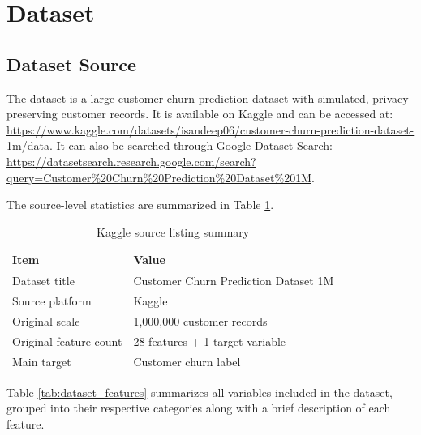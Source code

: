 \section{Dataset}

\subsection{Dataset Source}
The dataset is a large customer churn prediction dataset with simulated, privacy-preserving customer records. It is available on Kaggle and can be accessed at:
\url{https://www.kaggle.com/datasets/isandeep06/customer-churn-prediction-dataset-1m/data}. It can also be searched through Google Dataset Search:
\url{https://datasetsearch.research.google.com/search?query=Customer%20Churn%20Prediction%20Dataset%201M}.

The source-level statistics are summarized in Table \ref{tab:source_listing}.

\begin{table}[h]
\centering
\caption{Kaggle source listing summary}
\label{tab:source_listing}
\begin{tabular}{ll}
\toprule
\textbf{Item} & \textbf{Value} \\
\midrule
Dataset title & Customer Churn Prediction Dataset 1M \\
Source platform & Kaggle \\
Original scale & 1,000,000 customer records \\
Original feature count & 28 features + 1 target variable\\
Main target & Customer churn label \\
\bottomrule
\end{tabular}
\end{table}

Table \ref{tab:dataset_features} summarizes all variables included in the dataset, grouped into their respective categories along with a brief description of each feature.

